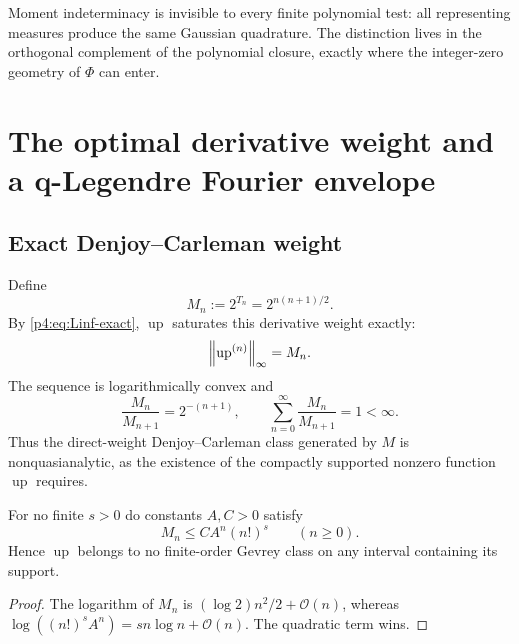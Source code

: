 \documentclass[11pt,oneside]{article}
\theoremstyle{definition}
\theoremstyle{remark}
\newcommand{\Up}{\operatorname{up}}
\newcommand{\bigO}{\mathcal O}
\begin{document}
\begin{remark}
Moment indeterminacy is invisible to every finite polynomial test: all representing measures
produce the same Gaussian quadrature.  The distinction lives in the orthogonal complement of
the polynomial closure, exactly where the integer-zero geometry of $\Phi$ can enter.
\end{remark}

\section{The optimal derivative weight and a q-Legendre Fourier envelope}
\label{p4:sec:carleman}

\subsection{Exact Denjoy--Carleman weight}

Define
\begin{equation}
 M_n:=2^{T_n}=2^{n(n+1)/2}.
 \label{p4:eq:Mn}
\end{equation}
By \eqref{p4:eq:Linf-exact}, $\Up$ saturates this derivative weight exactly:
\begin{equation}
 \norm{\Up^{(n)}}_\infty=M_n.
 \label{p4:eq:saturates-Mn}
\end{equation}
The sequence is logarithmically convex and
\begin{equation}
 \frac{M_n}{M_{n+1}}=2^{-(n+1)},
 \qquad
 \sum_{n=0}^{\infty}\frac{M_n}{M_{n+1}}=1<\infty.
 \label{p4:eq:nonquasianalytic-sum}
\end{equation}
Thus the direct-weight Denjoy--Carleman class generated by $M$ is nonquasianalytic, as the
existence of the compactly supported nonzero function $\Up$ requires.

\begin{proposition}
\label{p4:prop:not-Gevrey}
For no finite $s>0$ do constants $A,C>0$ satisfy
\begin{equation}
 M_n\leq CA^n(n!)^s\qquad(n\geq0).
 \label{p4:eq:no-Gevrey-bound}
\end{equation}
Hence $\Up$ belongs to no finite-order Gevrey class on any interval containing its support.
\end{proposition}

\begin{proof}
The logarithm of $M_n$ is $(\log2)n^2/2+\bigO(n)$, whereas
$\log((n!)^sA^n)=sn\log n+\bigO(n)$.  The quadratic term wins.
\end{proof}
\end{document}
